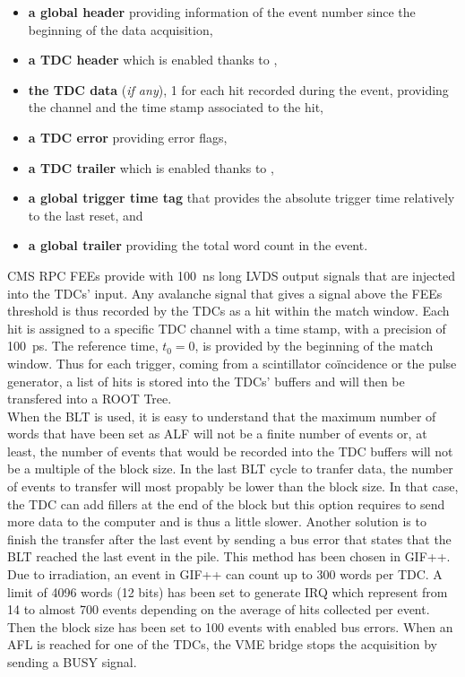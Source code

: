 	\begin{itemize}
		\item \textbf{a global header} providing information of the event number since the beginning of the data acquisition,
		\item \textbf{a TDC header} which is enabled thanks to ,
		\item \textbf{the TDC data} (\textit{if any}), 1 for each hit recorded during the event, providing the channel and the time stamp associated to the hit,
		\item \textbf{a TDC error} providing error flags,
		\item \textbf{a TDC trailer} which is enabled thanks to ,
		\item \textbf{a global trigger time tag} that provides the absolute trigger time relatively to the last reset, and
		\item \textbf{a global trailer} providing the total word count in the event.
	\end{itemize}
	
	CMS RPC FEEs provide with \SI{100}{ns} long LVDS output signals that are injected into the TDCs' input. Any avalanche signal that gives a signal above the FEEs threshold is thus recorded by the TDCs as a hit within the match window. Each hit is assigned to a specific TDC channel with a time stamp, with a precision of \SI{100}{ps}. The reference time, $t_0=0$, is provided by the beginning of the match window. Thus for each trigger, coming from a scintillator coïncidence or the pulse generator, a list of hits is stored into the TDCs' buffers and will then be transfered into a ROOT Tree.\\
	When the BLT is used, it is easy to understand that the maximum number of words that have been set as ALF will not be a finite number of events or, at least, the number of events that would be recorded into the TDC buffers will not be a multiple of the block size. In the last BLT cycle to tranfer data, the number of events to transfer will most propably be lower than the block size. In that case, the TDC can add fillers at the end of the block but this option requires to send more data to the computer and is thus a little slower. Another solution is to finish the transfer after the last event by sending a bus error that states that the BLT reached the last event in the pile. This method has been chosen in GIF++.\\
	Due to irradiation, an event in GIF++ can count up to 300 words per TDC. A limit of 4096 words (12 bits) has been set to generate IRQ which represent from 14 to almost 700 events depending on the average of hits collected per event. Then the block size has been set to 100 events with enabled bus errors. When an AFL is reached for one of the TDCs, the VME bridge stops the acquisition by sending a BUSY signal.\\
	
